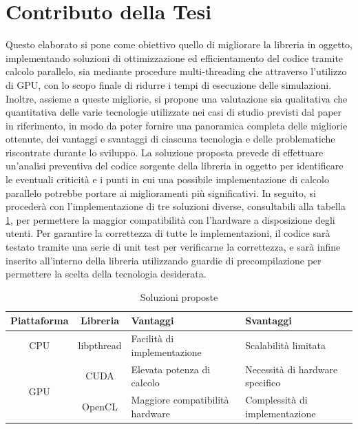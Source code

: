 \section{Contributo della Tesi}
\label{sec:contributo}

Questo elaborato si pone come obiettivo quello di migliorare la libreria in
oggetto, implementando soluzioni di ottimizzazione ed efficientamento del codice
tramite calcolo parallelo, sia mediante procedure multi-threading che attraverso
l'utilizzo di GPU, con lo scopo finale di ridurre i tempi di esecuzione delle simulazioni.
Inoltre, assieme a queste migliorie, si propone una valutazione sia qualitativa
che quantitativa delle varie tecnologie utilizzate nei casi di studio previsti
dal paper in riferimento\cite{cooperis}, in modo da poter fornire una panoramica
completa delle migliorie ottenute, dei vantaggi e svantaggi di ciascuna tecnologia
e delle problematiche riscontrate durante lo sviluppo. La soluzione proposta
prevede di effettuare un'analisi preventiva del codice sorgente della libreria
in oggetto per identificare le eventuali criticità e i punti in cui una
possibile implementazione di calcolo parallelo potrebbe portare ai miglioramenti
più significativi. In seguito, si procederà con l'implementazione di tre
soluzioni diverse, consultabili alla tabella \ref{tab:soluzioni}, per permettere
la maggior compatibilità con l'hardware a disposizione degli utenti. Per garantire
la correttezza di tutte le implementazioni, il codice sarà testato tramite una
serie di unit test per verificarne la correttezza, e sarà infine inserito all'interno
della libreria utilizzando guardie di precompilazione per permettere la scelta della
tecnologia desiderata.

\vspace{1em}

\begin{table}[ht]
  \begin{center}
    \begin{tabular}{ |c|c|l|l| }
      \hline
      \textbf{Piattaforma} & \textbf{Libreria} & \textbf{Vantaggi}               & \textbf{Svantaggi}              \\
      \hline
      CPU                  & libpthread        & Facilità di implementazione     & Scalabilità limitata            \\
      \hline
      \multirow{2}{*}{GPU} & CUDA              & Elevata potenza di calcolo      & Necessità di hardware specifico \\
      \cline{2-4}          & OpenCL            & Maggiore compatibilità hardware & Complessità di implementazione  \\
      \hline
    \end{tabular}
    \caption{Soluzioni proposte}
    \label{tab:soluzioni}
  \end{center}
\end{table}
